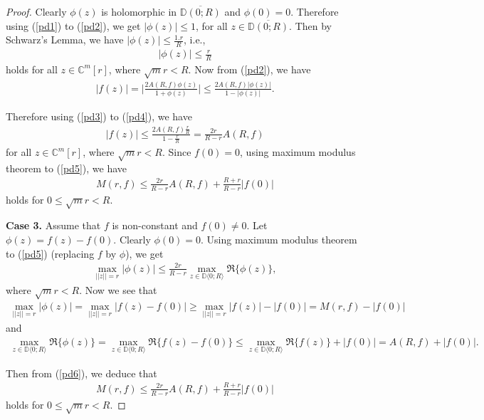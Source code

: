 \documentclass[10pt,a4paper]{amsart}
\newcommand{\ol}{\overline}
\begin{document}
\begin{proof}
Clearly $\phi(z)$ is holomorphic in $\ol{\mathbb{D}(0;R)}$ and $\phi(0)=0$. Therefore using (\ref{pd1}) to (\ref{pd2}), we get $|\phi(z)|\leq 1$, for all $z\in \ol{\mathbb{D}(0;R)}$. Then by Schwarz's Lemma, we have $|\phi(z)|\leq \frac{1.r}{R}$, i.e., 
\begin{align}\label{pd3}
|\phi(z)|\leq \frac{r}{R}
\end{align}
holds for all $z\in\mathbb{C}^m[r]$, where $\sqrt{m}r<R$. Now from (\ref{pd2}), we have 
\begin{align}\label{pd4} 
|f(z)|=\Big|\frac{2A(R,f)\phi(z)}{1+\phi(z)}\Big|\leq \frac{2A(R,f)|\phi(z)|}{1-|\phi(z)|}.
\end{align}

Therefore using (\ref{pd3}) to (\ref{pd4}), we have
\begin{align}\label{pd5} 
|f(z)|\leq \frac{2A(R,f)\frac{r}{R}}{1-\frac{r}{R}}=\frac{2r}{R-r}A(R,f)
\end{align}
for all $z\in\mathbb{C}^m[r]$, where $\sqrt{m}r<R$. Since $f(0)=0$, using maximum modulus theorem to (\ref{pd5}), we have 
\begin{align*}
 M(r,f)\leq \frac{2r}{R-r}A(R,f)+\frac{R+r}{R-r}|f(0)|
 \end{align*}
holds for $0\leq \sqrt{m}r<R$.\vspace{1.2mm}

{\bf Case 3.} Assume that $f$ is non-constant and $f(0)\not=0$. Let $\phi(z)=f(z)-f(0)$. Clearly $\phi(0)=0$. Using maximum modulus theorem to (\ref{pd5}) (replacing $f$ by $\phi$), we get
\begin{align}\label{pd6} 
\max\limits_{||z||=r}|\phi(z)|\leq \frac{2r}{R-r}\max\limits_{z\in \mathbb{D}\langle 0;R\rangle}\Re\{\phi(z)\},
\end{align}
where $\sqrt{m}r<R$. Now we see that
\begin{align*}
 \max\limits_{||z||=r}|\phi(z)|=\max\limits_{||z||=r}|f(z)-f(0)|\geq \max\limits_{||z||=r}|f(z)|-|f(0)|=M(r,f)-|f(0)|
 \end{align*}
and 
\begin{align*}
 \max\limits_{z\in \mathbb{D}\langle 0;R\rangle}\Re\{\phi(z)\}=\max\limits_{z\in \mathbb{D}\langle 0;R\rangle}\Re\{f(z)-f(0)\}\leq \max\limits_{z\in \mathbb{D}\langle 0;R\rangle}\Re\{f(z)\}+|f(0)|=A(R,f)+|f(0)|.
 \end{align*}

Then from (\ref{pd6}), we deduce that 
\begin{align*}
 M(r,f)\leq \frac{2r}{R-r}A(R,f)+\frac{R+r}{R-r}|f(0)|
 \end{align*}
holds for $0\leq \sqrt{m}r<R$.
\end{proof}
\end{document}
